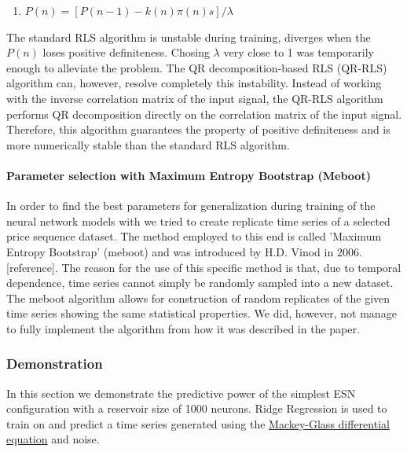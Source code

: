 \begin{itemize}
\begin{algorithm}[H]
\begin{enumerate}
\item $P(n) = [P(n-1)-k(n)\pi(n)s]/\lambda$
\end{enumerate}
\end{algorithm}
The standard RLS algorithm is unstable during training, diverges when the $P(n)$ loses positive definiteness. Chosing $\lambda$ very close to 1 was temporarily enough to alleviate the problem. The QR decomposition-based RLS (QR-RLS) algorithm can, however, resolve completely this instability. Instead of working with the inverse correlation matrix of the input signal, the QR-RLS algorithm performs QR decomposition directly on the correlation matrix of the input signal. Therefore, this algorithm guarantees the property of positive definiteness and is more numerically stable than the standard RLS algorithm.
\end{itemize}


\paragraph*{Parameter selection with Maximum Entropy Bootstrap (Meboot)}
In order to find the best parameters for generalization during training of the neural network models with we tried to create replicate time series of a selected price sequence dataset. The method employed to this end is called 'Maximum Entropy Bootstrap' (meboot) and was introduced by H.D. Vinod in 2006. [reference]. The reason for the use of this specific method is that, due to temporal dependence, time series cannot simply be randomly sampled into a new dataset. The meboot algorithm allows for construction of random replicates of the given time series showing the same statistical properties. We did, however, not manage to fully implement the algorithm from how it was described in the paper.

\subsubsection*{Demonstration}
In this section we demonstrate the predictive power of the simplest ESN configuration with a reservoir size of 1000 neurons. Ridge Regression is used to train on and predict a time series generated using the \href{http://www.scholarpedia.org/article/Mackey-Glass_equation}{Mackey-Glass differential equation} and noise.


